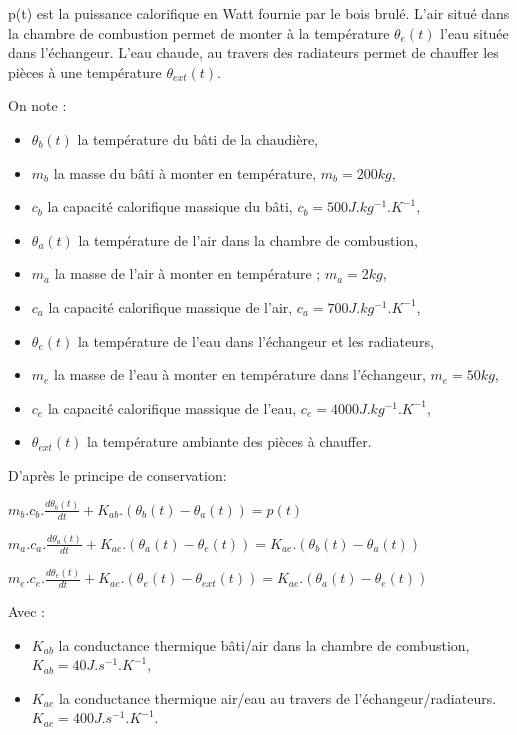 p(t) est la puissance calorifique en Watt fournie par le bois brulé. L'air situé dans la chambre de combustion permet de monter à la température $\theta_e(t)$ l'eau située dans l'échangeur. L'eau chaude, au travers des radiateurs permet de chauffer les pièces à une température $\theta_{ext}(t)$.

On note :
\begin{itemize}
 \item $\theta_b(t)$ la température du bâti de la chaudière,
 \item $m_b$ la masse du bâti à monter en température, $m_b=200kg$,
 \item $c_b$ la capacité calorifique massique du bâti, $c_b=500J.kg^{-1}.K^{-1}$,
 \item $\theta_a(t)$ la température de l'air dans la chambre de combustion,
 \item $m_a$ la masse de l'air à monter en température ; $m_a=2kg$,
 \item $c_a$ la capacité calorifique massique de l'air, $c_a=700J.kg^{-1}.K^{-1}$,
 \item $\theta_e(t)$ la température de l'eau dans l'échangeur et les radiateurs,
 \item $m_e$ la masse de l'eau à monter en température dans l'échangeur, $m_e=50kg$,
 \item $c_e$ la capacité calorifique massique de l'eau, $c_e=4000J.kg^{-1}.K^{-1}$,
 \item $\theta_{ext}(t)$ la température ambiante des pièces à chauffer.
\end{itemize}

D'après le principe de conservation:

$m_b.c_b.\frac{d\theta_b(t)}{dt}+K_{ab}.(\theta_b(t)-\theta_a(t))=p(t)$

$m_a.c_a.\frac{d\theta_a(t)}{dt}+K_{ae}.(\theta_a(t)-\theta_e(t))=K_{ae}.(\theta_b(t)-\theta_a(t))$

$m_e.c_e.\frac{d\theta_e(t)}{dt}+K_{ae}.(\theta_e(t)-\theta_{ext}(t))=K_{ae}.(\theta_a(t)-\theta_e(t))$

Avec :
\begin{itemize}
 \item $K_{ab}$ la conductance thermique bâti/air dans la chambre de combustion, $K_{ab}=40 J.s^{-1}.K^{-1}$,
 \item $K_{ae}$ la conductance thermique air/eau au travers de l'échangeur/radiateurs. $K_{ae}=400 J.s^{-1}.K^{-1}$.
\end{itemize}

